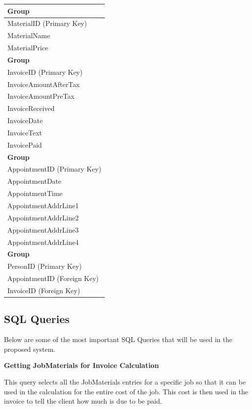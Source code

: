 \begin{flushleft}
\begin{longtable}{|p{12cm}|}
			\textbf{Group} \\ \hline
			MaterialID (Primary Key) \\
			MaterialName \\
			MaterialPrice \\ \hline


			\textbf{Group} \\ \hline
			InvoiceID (Primary Key) \\
			InvoiceAmountAfterTax \\
			InvoiceAmountPreTax \\
			InvoiceReceived \\
			InvoiceDate \\ 
			InvoiceText \\
			InvoicePaid \\	\hline

		\textbf{Group} \\ \hline 
			AppointmentID (Primary Key) \\
			AppointmentDate \\
			AppointmentTime \\
			AppointmentAddrLine1 \\
			AppointmentAddrLine2 \\
			AppointmentAddrLine3	\\
			AppointmentAddrLine4 \\ \hline


			\textbf{Group} \\ \hline
			PersonID (Primary Key) \\
			AppointmentID (Foreign Key) \\
			InvoiceID (Foreign Key) \\ \hline

			
    \end{longtable}
\end{flushleft}




\pagebreak
\subsection{SQL Queries}
\begin{flushleft}
Below are some of the most important SQL Queries that will be used in the proposed system.
\end{flushleft}


\textbf{Getting JobMaterials for Invoice Calculation}
\begin{flushleft}
This query selects all the JobMaterials entries for a specific job so that it can be used in the calculation for the entire cost of the job. This cost is then used in the invoice to tell the client how much is due to be paid.
\end{flushleft}


